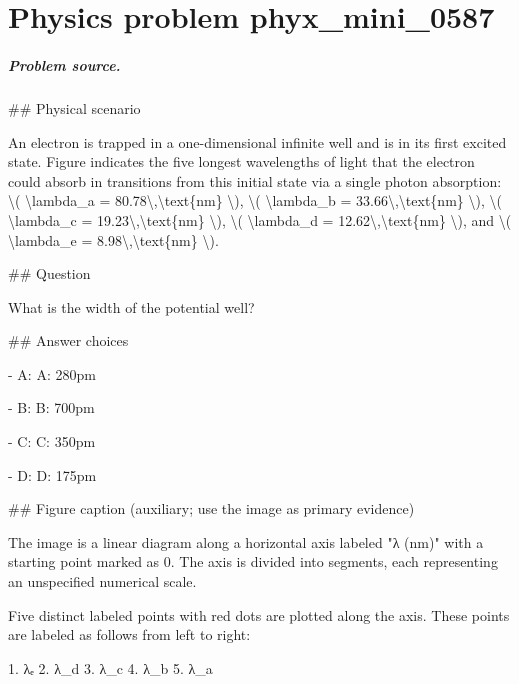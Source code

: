 
\chapter{Physics problem phyx\_mini\_0587}
\label{ch:PhyXMiniProblems_problem_phyx_mini_0587}

\paragraph{Problem source.}
\#\# Physical scenario

An electron is trapped in a one-dimensional infinite well and is in its first excited state. Figure indicates the five longest wavelengths of light that the electron could absorb in transitions from this initial state via a single photon absorption: \textbackslash{}( \textbackslash{}lambda\_a = 80.78\textbackslash{},\textbackslash{}text\{nm\} \textbackslash{}), \textbackslash{}( \textbackslash{}lambda\_b = 33.66\textbackslash{},\textbackslash{}text\{nm\} \textbackslash{}), \textbackslash{}( \textbackslash{}lambda\_c = 19.23\textbackslash{},\textbackslash{}text\{nm\} \textbackslash{}), \textbackslash{}( \textbackslash{}lambda\_d = 12.62\textbackslash{},\textbackslash{}text\{nm\} \textbackslash{}), and \textbackslash{}( \textbackslash{}lambda\_e = 8.98\textbackslash{},\textbackslash{}text\{nm\} \textbackslash{}).

\#\# Question

What is the width of the potential well?

\#\# Answer choices

- A: A: 280pm

- B: B: 700pm

- C: C: 350pm

- D: D: 175pm

\#\# Figure caption (auxiliary; use the image as primary evidence)

The image is a linear diagram along a horizontal axis labeled "λ (nm)" with a starting point marked as 0. The axis is divided into segments, each representing an unspecified numerical scale.

Five distinct labeled points with red dots are plotted along the axis. These points are labeled as follows from left to right:

1. λₑ
2. λ\_d
3. λ\_c
4. λ\_b
5. λ\_a

